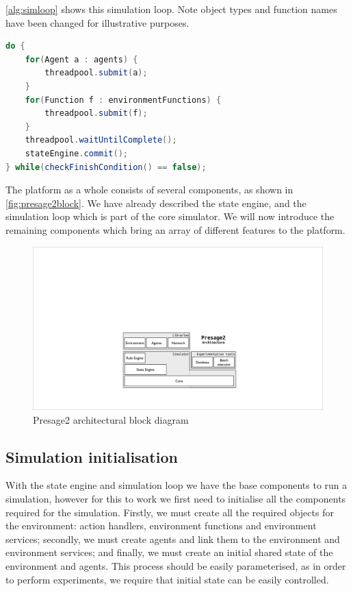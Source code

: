 \autoref{alg:simloop} shows this simulation loop. Note object types and function names have been changed for illustrative purposes.

\begin{lstlisting}[caption={Presage2 multi-threaded simulation loop},label=alg:simloop,language=Java,float=tbh]
do {
	for(Agent a : agents) {
		threadpool.submit(a);
	}
	for(Function f : environmentFunctions) {
		threadpool.submit(f);
	}
	threadpool.waitUntilComplete();
	stateEngine.commit();
} while(checkFinishCondition() == false);
\end{lstlisting}

The platform as a whole consists of several components, as shown in
\autoref{fig:presage2block}. We have already described the state engine, and
the simulation loop which is part of the core simulator. We will now introduce
the remaining components which bring an array of different features to the
platform.

\begin{figure}[tb]
\caption{Presage2 architectural block diagram}\label{fig:presage2block}
\includegraphics[width=\linewidth]{gfx/presage2/architecture_block}
\end{figure}

\subsection{Simulation initialisation}

With the state engine and simulation loop we have the base components to run a
simulation, however for this to work we first need to initialise all the
components required for the simulation. Firstly, we must create all the required
objects for the environment: action handlers, environment functions and
environment services; secondly, we must create agents and link them to the
environment and environment services; and finally, we must create an initial
shared state of the environment and agents. This process should be easily
parameterised, as in order to perform experiments, we require that initial state
can be easily controlled.

